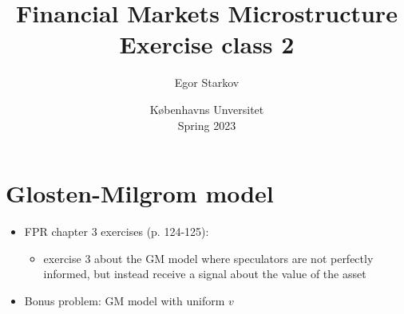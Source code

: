 \documentclass[english,10pt
,aspectratio=169
]{beamer}
\title{Financial Markets Microstructure \\ Exercise class 2}
\author{Egor Starkov}
\date{K{\o}benhavns Unversitet \\
	Spring 2023}
\begin{document}
\addtocounter{framenumber}{-1}



\section{Glosten-Milgrom model}

\begin{frame}%
	\begin{itemize}
		\item FPR chapter 3 exercises (p. 124-125):
		\begin{itemize}
			\item exercise 3 about the GM model where speculators are not perfectly informed, but instead receive a signal about the value of the asset
		\end{itemize}
		\item Bonus problem: GM model with uniform $v$
	\end{itemize}
\end{frame}
\end{document}
